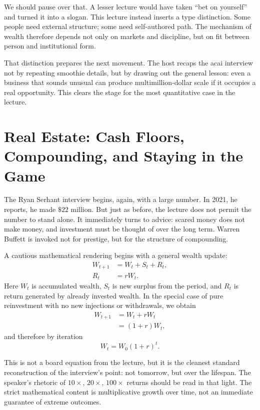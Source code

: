 We should pause over that. A lesser lecture would have taken ``bet on yourself'' and turned it into a slogan. This lecture instead inserts a type distinction. Some people need external structure; some need self-authored path. The mechanism of wealth therefore depends not only on markets and discipline, but on fit between person and institutional form.

That distinction prepares the next movement. The host recaps the acai interview not by repeating smoothie details, but by drawing out the general lesson: even a business that sounds unusual can produce multimillion-dollar scale if it occupies a real opportunity. This clears the stage for the most quantitative case in the lecture.

\section{Real Estate: Cash Floors, Compounding, and Staying in the Game}

The Ryan Serhant interview begins, again, with a large number. In 2021, he reports, he made \(\$22\) million. But just as before, the lecture does not permit the number to stand alone. It immediately turns to advice: scared money does not make money, and investment must be thought of over the long term. Warren Buffett is invoked not for prestige, but for the structure of compounding.

A cautious mathematical rendering begins with a general wealth update:
\begin{align}
W_{t+1} &= W_t + S_t + R_t, \\
R_t &= rW_t.
\end{align}
Here \(W_t\) is accumulated wealth, \(S_t\) is new surplus from the period, and \(R_t\) is return generated by already invested wealth. In the special case of pure reinvestment with no new injections or withdrawals, we obtain
\begin{align}
W_{t+1} &= W_t + rW_t \\
&= (1+r)W_t,
\end{align}
and therefore by iteration
\begin{equation}
W_t = W_0(1+r)^t.
\end{equation}

This is not a board equation from the lecture, but it is the cleanest standard reconstruction of the interview's point: not tomorrow, but over the lifespan. The speaker's rhetoric of \(10\times\), \(20\times\), \(100\times\) returns should be read in that light. The strict mathematical content is multiplicative growth over time, not an immediate guarantee of extreme outcomes.

